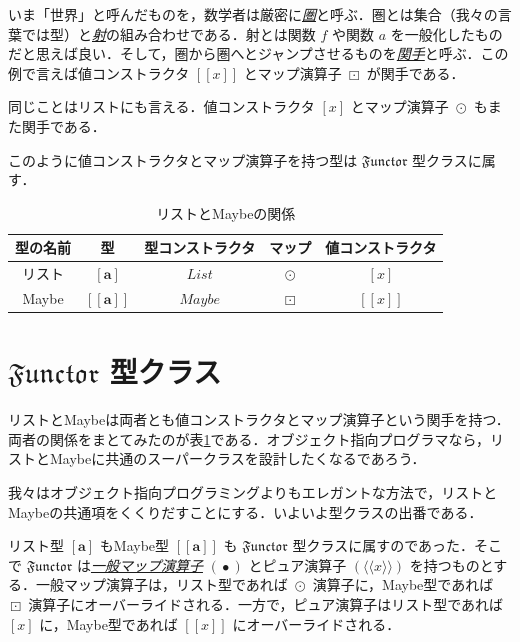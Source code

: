 \documentclass[a4paper]{jsbook}
\def\[{\left[\!\left[}
\def\]{\right]\!\right]}
\newcommand{\keyword}[1]{{\underline{\emph{#1}}}}
\newcommand{\mType}[1]{\mathbf{#1}}
\newcommand{\mListType}[1]{[\mType{#1}]}
\newcommand{\mMaybeType}[1]{\[\mType{#1}\]}
\newcommand{\mTypeConstructor}[1]{\mathit{#1}} %
\newcommand{\mSpecialTypeClass}[1]{\mathfrak{#1}} %
\newcommand{\mFunctorTypeClass}{\mSpecialTypeClass{Functor}}
\newcommand{\mListWith}[1]{\left[#1\right]}
\newcommand{\mMaybeWith}[1]{\[#1\]}
\newcommand{\mPureWith}[1]{\langle\!\langle#1\rangle\!\rangle}
\DeclareMathOperator{\mMap}{\bullet}
\DeclareMathOperator{\mMapList}{\odot}
\DeclareMathOperator{\mMapMaybe}{\boxdot}
\DeclareMathOperator{\mListTypeConstructor}{\mTypeConstructor{List}}
\DeclareMathOperator{\mMaybeTypeConstructor}{\mTypeConstructor{Maybe}}
\begin{document}
いま「世界」と呼んだものを，数学者は厳密に\keyword{圏}と呼ぶ．圏とは集合（我々の言葉では型）と\keyword{射}の組み合わせである．射とは関数 $f$ や関数 $a$ を一般化したものだと思えば良い．そして，圏から圏へとジャンプさせるものを\keyword{関手}と呼ぶ．この例で言えば値コンストラクタ $\mMaybeWith{x}$ とマップ演算子 $\mMapMaybe$ が関手である．

同じことはリストにも言える．値コンストラクタ $\mListWith{x}$ とマップ演算子 $\mMapList$ もまた関手である．

このように値コンストラクタとマップ演算子を持つ型は $\mFunctorTypeClass$ 型クラスに属す．

\begin{table}
\label{tab:list-and-maybe}
\caption{リストとMaybeの関係}
\begin{center}
\begin{tabular}{||c|c|c|c|c||}\hline
型の名前&型&型コンストラクタ&マップ&値コンストラクタ\\\hline\hline
リスト&$\mListType{a}$&$\mListTypeConstructor$&$\mMapList$&$\mListWith{x}$\\
Maybe&$\mMaybeType{a}$&$\mMaybeTypeConstructor$&$\mMapMaybe$&$\mMaybeWith{x}$\\\hline
\end{tabular}
\end{center}
\end{table}

\section{$\mFunctorTypeClass$ 型クラス}

リストとMaybeは両者とも値コンストラクタとマップ演算子という関手を持つ．両者の関係をまとてみたのが表\ref{tab:list-and-maybe}である．オブジェクト指向プログラマなら，リストとMaybeに共通のスーパークラスを設計したくなるであろう．

我々はオブジェクト指向プログラミングよりもエレガントな方法で，リストとMaybeの共通項をくくりだすことにする．いよいよ型クラスの出番である．

リスト型 $\mListType{a}$ もMaybe型 $\mMaybeType{a}$ も $\mFunctorTypeClass$ 型クラスに属すのであった．そこで $\mFunctorTypeClass$ は\keyword{一般マップ演算子} $(\mMap)$ とピュア演算子 $(\mPureWith{x})$ を持つものとする．一般マップ演算子は，リスト型であれば $\mMapList$ 演算子に，Maybe型であれば $\mMapMaybe$ 演算子にオーバーライドされる．一方で，ピュア演算子はリスト型であれば $\mListWith{x}$ に，Maybe型であれば $\mMaybeWith{x}$ にオーバーライドされる．
\end{document}

